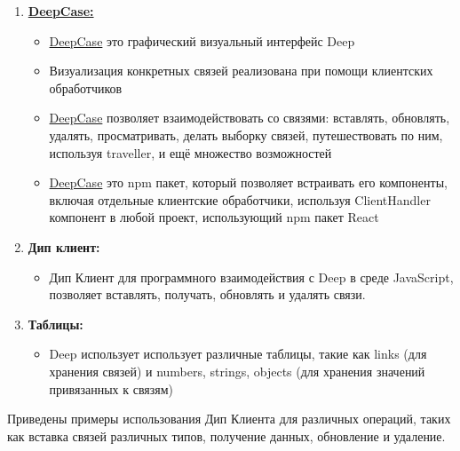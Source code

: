 \begin{enumerate}
      \item \textbf{\hyperlink{DeepCase.Description}{DeepCase:}}
            \begin{itemize}
                  \item \hyperlink{DeepCase.Description}{DeepCase} это
                        графический
                        визуальный
                        интерфейс Deep
                  \item Визуализация конкретных связей реализована при помощи
                        клиентских обработчиков
                  \item \hyperlink{DeepCase.Description}{DeepCase} позволяет
                        взаимодействовать
                        со связями: вставлять,
                        обновлять, удалять, просматривать, делать выборку
                        связей,
                        путешествовать по ним, используя traveller, и ещё
                        множество
                        возможностей
                  \item \hyperlink{DeepCase.Description}{DeepCase} это npm
                        пакет,
                        который
                        позволяет встраивать его
                        компоненты, включая отдельные клиентские обработчики,
                        используя
                        ClientHandler
                        компонент в любой проект, использующий npm пакет React
            \end{itemize}

      \item \textbf{Дип клиент:}
            \begin{itemize}
                  \item Дип Клиент для программного взаимодействия с Deep в
                        среде
                        JavaScript, позволяет вставлять, получать, обновлять и
                        удалять
                        связи.
            \end{itemize}

      \item \textbf{Таблицы:}
            \begin{itemize}
                  \item Deep использует использует различные таблицы, такие как
                        links
                        (для хранения связей) и numbers, strings, objects (для
                        хранения
                        значений
                        привязанных к связям)
            \end{itemize}
\end{enumerate}

Приведены примеры использования Дип Клиента для различных операций, таких как
вставка связей различных типов, получение данных, обновление и удаление.


\tableofcontents